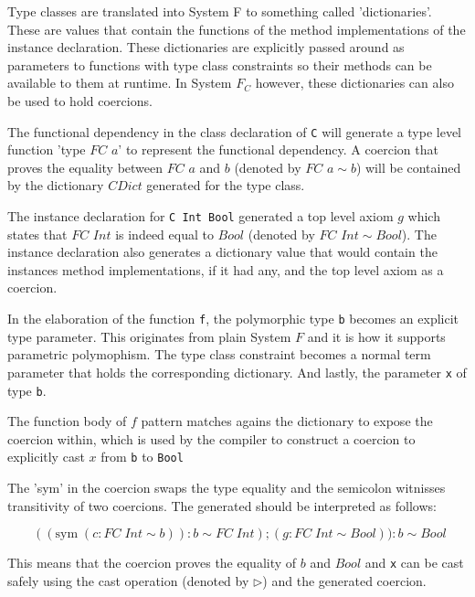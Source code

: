 Type classes are translated into System F to something called 'dictionaries'.
These are values that contain the functions of the method implementations of the
instance declaration. These dictionaries are explicitly passed around as
parameters to functions with type class constraints so their methods can be
available to them at runtime. In System $F_C$ however, these dictionaries can
also be used to hold coercions.

The functional dependency in the class declaration of \texttt{C} will generate a
type level function 'type $FC$ $a$' to represent the functional dependency. A
coercion that proves the equality between $FC$ $a$ and $b$ (denoted by $FC$ $a
\sim b$) will be contained by the dictionary $CDict$ generated for the type
class.

The instance declaration for \texttt{C Int Bool} generated a top level axiom
$g$ which states that $FC$ $Int$ is indeed equal to $Bool$ (denoted by $FC$ $Int
\sim Bool$). The instance declaration also generates a dictionary value that
would contain the instances method implementations, if it had any, and the top
level axiom as a coercion.

In the elaboration of the function \texttt{f}, the polymorphic type \texttt{b}
becomes an explicit type parameter. This originates from plain System $F$ and it
is how it supports parametric polymophism. The type class constraint becomes a
normal term parameter that holds the corresponding dictionary. And lastly, the
parameter \texttt{x} of type \texttt{b}.

The function body of $f$ pattern matches agains the dictionary to expose the
coercion within, which is used by the compiler to construct a coercion to
explicitly cast $x$ from \texttt{b} to \texttt{Bool}

The 'sym' in the coercion swaps the type equality and the semicolon witnisses
transitivity of two coercions. The generated should be interpreted as follows:

$\quad\quad((\text{sym} \; (c : FC \; Int \sim b)) : b \sim FC \; Int) ; (g : FC
\; Int \sim Bool) ) : b \sim Bool$

This means that the coercion proves the equality of $b$ and $Bool$ and
\texttt{x} can be cast safely using the cast operation (denoted by
$\triangleright$) and the generated coercion.
